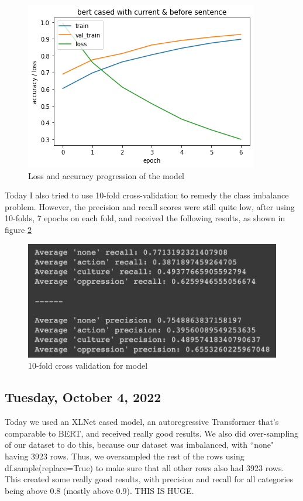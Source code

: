 \documentclass[11pt,letterpaper]{article}
\begin{document}
\begin{figure}
    \centering
    \includegraphics[scale=0.8]{images/bert_history.png}
    \caption{Loss and accuracy progression of the model}
    \label{fig:bert_history}
\end{figure}

Today I also tried to use 10-fold cross-validation to remedy the class imbalance problem. However, the precision and recall scores were still quite low, after using 10-folds, 7 epochs on each fold, and received the following results, as shown in figure \ref{fig:ten_folds}

\begin{figure}
    \centering
    \includegraphics[scale=0.8]{images/ten_folds.png}
    \caption{10-fold cross validation for model}
    \label{fig:ten_folds}
\end{figure}

\subsection{Tuesday, October 4, 2022}
Today we used an XLNet cased model, an autoregressive Transformer that's comparable to BERT, and received really good results. We also did over-sampling of our dataset to do this, because our dataset was imbalanced, with ``none" having 3923 rows. Thus, we oversampled the rest of the rows using df.sample(replace=True) to make sure that all other rows also had 3923 rows. This created some really good results, with precision and recall for all categories being above 0.8 (mostly above 0.9). THIS IS HUGE.
\end{document}
